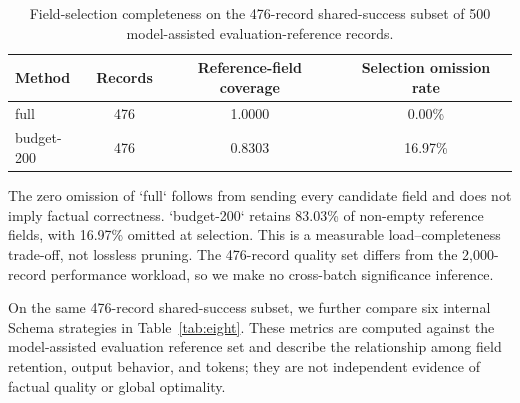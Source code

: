 \documentclass[runningheads]{llncs}
\begin{document}
\begin{table}[htbp]\centering\small
\caption{Field-selection completeness on the 476-record shared-success subset of 500 model-assisted evaluation-reference records.}\label{tab:coverage}
\begin{tabular}{@{}lccc@{}}\toprule
Method & Records & Reference-field coverage & Selection omission rate\\\midrule
full & 476 & 1.0000 & 0.00\%\\
budget-200 & 476 & 0.8303 & 16.97\%\\\bottomrule
\end{tabular}\end{table}

The zero omission of `full` follows from sending every candidate field and does not imply factual correctness. `budget-200` retains 83.03\% of non-empty reference fields, with 16.97\% omitted at selection. This is a measurable load--completeness trade-off, not lossless pruning. The 476-record quality set differs from the 2,000-record performance workload, so we make no cross-batch significance inference.

On the same 476-record shared-success subset, we further compare six internal Schema strategies in Table~\ref{tab:eight}. These metrics are computed against the model-assisted evaluation reference set and describe the relationship among field retention, output behavior, and tokens; they are not independent evidence of factual quality or global optimality.

\begin{table}[htbp]
\centering
\scriptsize
\setlength{\tabcolsep}{2pt}
\caption{Comparison of six internal methods on the 476-record shared-success subset of 500 model-assisted evaluation-reference records.}
\label{tab:eight}
\end{table}
\end{document}
